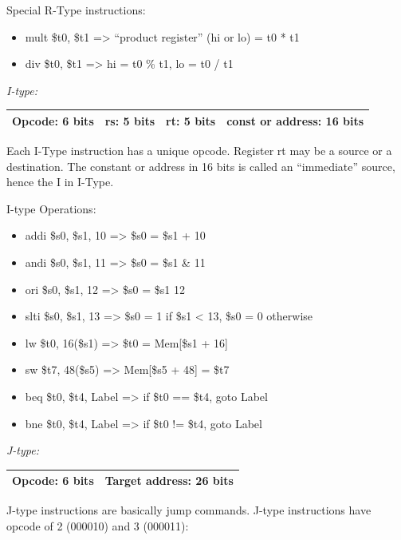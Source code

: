 \documentclass[
    paper=letter,
    parskip=half,
    fontsize=12pt,
    titlepage=firstiscover,
    toc=bibliography,
    numbers=endperiod
]{scrartcl}
\providecommand{\tightlist}{%
  \setlength{\itemsep}{0pt}\setlength{\parskip}{0pt}}
\begin{document}
Special R-Type instructions:

\begin{itemize}
    \tightlist
    \item mult \$t0, \$t1 =\textgreater{} ``product register'' (hi or lo) = t0 *
          t1
    \item div \$t0, \$t1 =\textgreater{} hi = t0 \% t1, lo = t0 / t1
\end{itemize}

\emph{I-type:}

\begin{tabularx}{\textwidth}{|c|c|c|C|}
    \hline
    Opcode: 6 bits & rs: 5 bits & rt: 5 bits & const or address: 16 bits \\
    \hline
\end{tabularx}

Each I-Type instruction has a unique opcode. Register rt may be a source
or a destination. The constant or address in 16 bits is called an
``immediate'' source, hence the I in I-Type.

I-type Operations:

\begin{itemize}
    \tightlist
    \item addi \$s0, \$s1, 10 =\textgreater{} \$s0 = \$s1 + 10
    \item andi \$s0, \$s1, 11 =\textgreater{} \$s0 = \$s1 \& 11
    \item ori \$s0, \$s1, 12 =\textgreater{} \$s0 = \$s1 \textbar{} 12
    \item slti \$s0, \$s1, 13 =\textgreater{} \$s0 = 1 if \$s1 \textless{} 13,
          \$s0 = 0 otherwise
    \item lw \$t0, 16(\$s1) =\textgreater{} \$t0 = Mem{[}\$s1 + 16{]}
    \item sw \$t7, 48(\$s5) =\textgreater{} Mem{[}\$s5 + 48{]} = \$t7
    \item beq \$t0, \$t4, Label =\textgreater{} if \$t0 == \$t4, goto Label
    \item bne \$t0, \$t4, Label =\textgreater{} if \$t0 != \$t4, goto Label
\end{itemize}

\emph{J-type:}

\begin{tabularx}{\textwidth}{|c|C|}
    \hline
    Opcode: 6 bits & Target address: 26 bits \\
    \hline
\end{tabularx}

J-type instructions are basically jump commands. J-type instructions
have opcode of 2 (000010) and 3 (000011):
\end{document}
